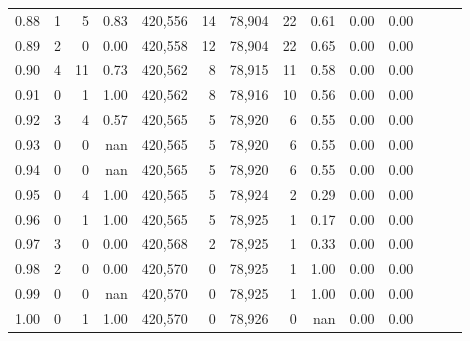 \begin{tabular}{rrrrrrrrrrrrrr}
0.88 &       1 &      5 &  0.83 &  420,556 &       14 &  78,904 &      22 &  0.61 &  0.00 &      0.00 \\
0.89 &       2 &      0 &  0.00 &  420,558 &       12 &  78,904 &      22 &  0.65 &  0.00 &      0.00 \\
0.90 &       4 &     11 &  0.73 &  420,562 &        8 &  78,915 &      11 &  0.58 &  0.00 &      0.00 \\
0.91 &       0 &      1 &  1.00 &  420,562 &        8 &  78,916 &      10 &  0.56 &  0.00 &      0.00 \\
0.92 &       3 &      4 &  0.57 &  420,565 &        5 &  78,920 &       6 &  0.55 &  0.00 &      0.00 \\
0.93 &       0 &      0 &   nan &  420,565 &        5 &  78,920 &       6 &  0.55 &  0.00 &      0.00 \\
0.94 &       0 &      0 &   nan &  420,565 &        5 &  78,920 &       6 &  0.55 &  0.00 &      0.00 \\
0.95 &       0 &      4 &  1.00 &  420,565 &        5 &  78,924 &       2 &  0.29 &  0.00 &      0.00 \\
0.96 &       0 &      1 &  1.00 &  420,565 &        5 &  78,925 &       1 &  0.17 &  0.00 &      0.00 \\
0.97 &       3 &      0 &  0.00 &  420,568 &        2 &  78,925 &       1 &  0.33 &  0.00 &      0.00 \\
0.98 &       2 &      0 &  0.00 &  420,570 &        0 &  78,925 &       1 &  1.00 &  0.00 &      0.00 \\
0.99 &       0 &      0 &   nan &  420,570 &        0 &  78,925 &       1 &  1.00 &  0.00 &      0.00 \\
1.00 &       0 &      1 &  1.00 &  420,570 &        0 &  78,926 &       0 &   nan &  0.00 &      0.00 \\
\bottomrule
\end{tabular}
